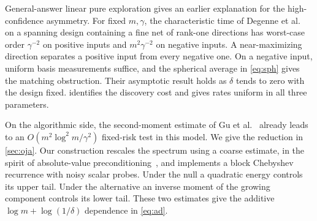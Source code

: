 General-answer linear pure exploration gives an earlier explanation for the high-confidence asymmetry. For fixed \(m,\gamma\), the characteristic time of Degenne et al.~\cite{degenne2020} on a spanning design containing a fine net of rank-one directions has worst-case order \(\gamma^{-2}\) on positive inputs and \(m^2\gamma^{-2}\) on negative inputs. A near-maximizing direction separates a positive input from every negative one. On a negative input, uniform basis measurements suffice, and the spherical average in \eqref{eq:sph} gives the matching obstruction. Their asymptotic result holds as \(\delta\) tends to zero with the design fixed.  identifies the discovery cost and gives rates uniform in all three parameters.

On the algorithmic side, the second-moment estimate of Gu et al.~\cite{gu2026} already leads to an \(O(m^2\log^2m/\gamma^2)\) fixed-risk test in this model. We give the reduction in \cref{sec:oja}. Our construction rescales the spectrum using a coarse estimate, in the spirit of absolute-value preconditioning~\cite{vecharynski2013}, and implements a block Chebyshev recurrence with noisy scalar probes. Under the null a quadratic energy controls its upper tail. Under the alternative an inverse moment of the growing component controls its lower tail. These two estimates give the additive \(\log m+\log(1/\delta)\) dependence in \eqref{eq:ad}.
